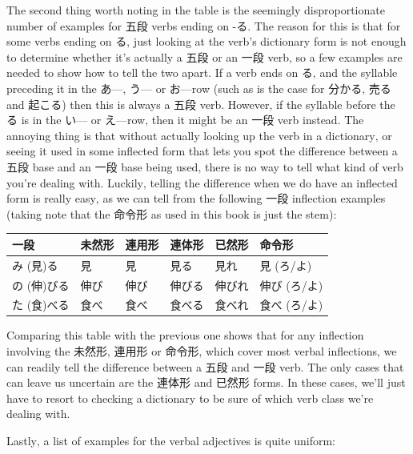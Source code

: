 \documentclass[11pt, b5paper, twoside, openright, onecolumn]{book}
\makeatletter
\newcommand*{\rtrubystack}[2]{{\relscale{0.5}%
  \begin{tabular}[b]{@{}c@{}}%
    {#1}\\%
    {\textscale{2}{#2}}%
  \end{tabular}}%
}
\DeclareRobustCommand*{\rtruby}[2]{%
  \mbox{%
    \setlength{\parskip}{0ex}%
    \BeginAccSupp{method=pdfstringdef,ActualText={#1}}%
      \rtrubystack{\phantom{#2}}{#1}%
      \llap{%
        \rtrubystack{#2}{\phantom{#1}}%
      }%
    \EndAccSupp{}%
  }%
}
\renewcommand*{\rtruby}[2]{#2 (#1)}%
\newenvironment{mytabular}[1]{\noindent\hspace{0.4in}
\begin{tabular}[h]{#1}}{\end{tabular}}
\makeatother
\begin{document}
The second thing worth noting in the table is the seemingly disproportionate number of examples for 五段 verbs ending on -る. The reason for this is that for some verbs ending on る‚ just looking at the verb’s dictionary form is not enough to determine whether it’s actually a 五段 or an 一段 verb‚ so a few examples are needed to show how to tell the two apart. If a verb ends on る‚ and the syllable preceding it in the あ—‚ う— or お—row (such as is the case for 分かる‚ 売る and 起こる) then this is always a 五段 verb. However‚ if the syllable before the る is in the い— or え—row‚ then it might be an 一段 verb instead. The annoying thing is that without actually looking up the verb in a dictionary‚ or seeing it used in some inflected form that lets you spot the difference between a 五段 base and an 一段 base being used‚ there is no way to tell what kind of verb you’re dealing with. Luckily‚ telling the difference when we do have an inflected form is really easy‚ as we can tell from the following 一段 inflection examples (taking note that the 命令形 as used in this book is just the stem):

\vspace{0.5cm}
\smaller
\begin{mytabular}{| l  l  l  l  l  l |}\hline 
\rule{0pt}{2.4ex}一段 & 未然形 & 連用形 & 連体形 & 已然形 & 命令形\\ 
\hline
\rule{0pt}{3.6ex}\rtruby{見}{み}る & 見 & 見 & 見る & 見れ & 見 (ろ/よ)\\ 
\rule{0pt}{3.6ex}\rtruby{伸}{の}びる & 伸び & 伸び & 伸びる & 伸びれ & 伸び (ろ/よ)\\ 
\rule{0pt}{3.6ex}\rtruby{食}{た}べる & 食べ & 食べ & 食べる & 食べれ & 食べ (ろ/よ)\\ 
\hline 
\end{mytabular}
\larger
\vspace{0.5cm}


Comparing this table with the previous one shows that for any inflection involving the 未然形‚ 連用形 or 命令形‚ which cover most verbal inflections‚ we can readily tell the difference between a 五段 and 一段 verb. The only cases that can leave us uncertain are the 連体形 and 已然形 forms. In these cases‚ we’ll just have to resort to checking a dictionary to be sure of which verb class we’re dealing with.

Lastly‚ a list of examples for the verbal adjectives is quite uniform:
\end{document}
